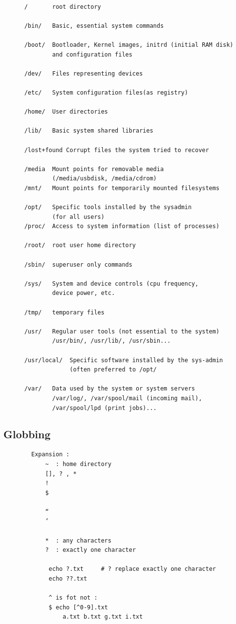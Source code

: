 \documentclass[a4paper,12pt]{article}
\begin{document}
\begin{verbatim}

      /       root directory
      
      /bin/   Basic, essential system commands
      
      /boot/  Bootloader, Kernel images, initrd (initial RAM disk) 
              and configuration files
              
      /dev/   Files representing devices
      
      /etc/   System configuration files(as registry)
      
      /home/  User directories
      
      /lib/   Basic system shared libraries

      /lost+found Corrupt files the system tried to recover

      /media  Mount points for removable media 
              (/media/usbdisk, /media/cdrom)
      /mnt/   Mount points for temporarily mounted filesystems
      
      /opt/   Specific tools installed by the sysadmin 
              (for all users)
      /proc/  Access to system information (list of processes)
      
      /root/  root user home directory
      
      /sbin/  superuser only commands
      
      /sys/   System and device controls (cpu frequency,
              device power, etc.
              
      /tmp/   temporary files
      
      /usr/   Regular user tools (not essential to the system)
              /usr/bin/, /usr/lib/, /usr/sbin...
              
      /usr/local/  Specific software installed by the sys-admin
                   (often preferred to /opt/

      /var/   Data used by the system or system servers 
              /var/log/, /var/spool/mail (incoming mail), 
              /var/spool/lpd (print jobs)...

\end{verbatim}


\subsection{Globbing}
\begin{verbatim}
		Expansion : 
			~  : home directory
			[], ? , *
			!
			$

			“
			‘
﻿
			*  : any characters
			?  : exactly one character
             
             echo ?.txt     # ? replace exactly one character
             echo ??.txt
             
             ^ is fot not :
             $ echo [^0-9].txt
                 a.txt b.txt g.txt i.txt    
            
\end{verbatim} 
           
           
\end{document}

